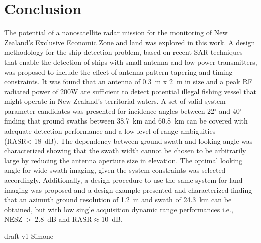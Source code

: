 \documentclass[conference,a4paper]{IEEEtran}
\begin{document}
    \section{Conclusion}
    \label{sec:conclusion}
    The potential of a nanosatellite radar mission for the monitoring of New Zealand's Exclusive Economic Zone and land was explored in this work.
    A design methodology for the ship detection problem, based on recent SAR techniques that enable the detection of ships with small antenna and low power transmitters, was proposed to include the effect of antenna pattern tapering and timing constraints.
    It was found that an antenna of 0.3~m x 2~m in size and a peak RF radiated power of 200W are sufficient to detect potential illegal fishing vessel that might operate in New Zealand's territorial waters.
    A set of valid system parameter candidates was presented for incidence angles between 22$^\circ$ and 40$^\circ$ finding that ground swaths between 38.7~km and 60.8~km can be covered with adequate detection performance and a low level of range ambiguities (RASR<-18~dB).
    The dependency between ground swath and looking angle was characterized showing that the swath width cannot be chosen to be arbitrarily large by reducing the antenna aperture size in elevation.
    The optimal looking angle for wide swath imaging, given the system constraints was selected accordingly.
    Additionally, a design procedure to use the same system for land imaging was proposed and a design example presented and characterized finding that an azimuth ground resolution of 1.2~m and swath of 24.3~km can be obtained, but with low single acquisition dynamic range performances i.e., NESZ~>~2.8~dB and RASR$\approx$10~dB.





%
%
%
    
    

    \color{red}
    draft v1 Simone


\end{document}
